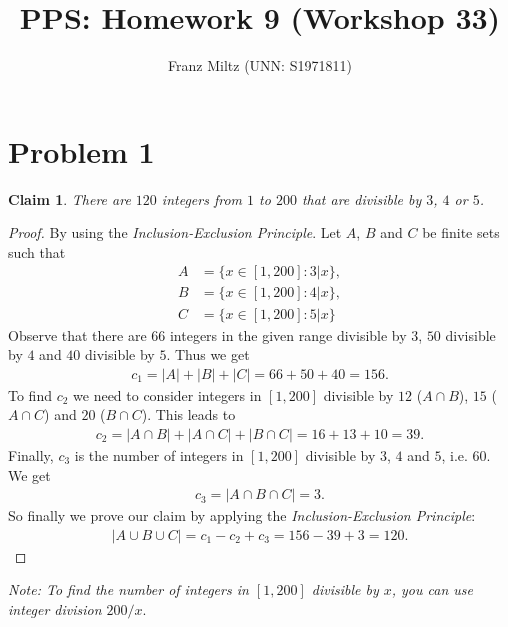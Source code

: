 \documentclass{article}
\title{PPS: Homework 9 (Workshop 33)}
\author{Franz Miltz (UNN: S1971811)}
\newtheorem{claim}[section]{Claim}
\begin{document}
\maketitle
\section*{Problem 1}
\begin{claim}
  There are $120$ integers from $1$ to $200$ that are divisible by $3$, $4$ or $5$.
\end{claim}
\begin{proof}
  By using the \emph{Inclusion-Exclusion Principle}.
   Let $A$, $B$ and $C$ be finite sets such that
  \begin{align*}
    A &= \{x\in [1,200] : 3 | x\},\\
    B &= \{x \in [1,200] : 4|x\},\\
    C &= \{x\in [1,200] : 5|x\}
  \end{align*} 
  Observe that there are $66$ integers in the given range divisible by $3$, $50$ divisible by $4$ and $40$ divisible by $5$. 
  Thus we get
  \begin{align*}
    c_1 = |A| + |B| + |C| = 66 + 50 + 40 = 156.
  \end{align*}
  To find $c_2$ we need to consider integers in $[1,200]$ divisible by $12$ ($A\cap B$), $15$ ($A\cap C$) and $20$ ($B\cap C$). This leads to
  \begin{align*}
    c_2 = |A\cap B| + |A\cap C| + |B \cap C| = 16 + 13 + 10 = 39.
  \end{align*}
  Finally, $c_3$ is the number of integers in $[1,200]$ divisible by $3$, $4$ and $5$, i.e. $60$. We get
  \begin{align*}
    c_3 = |A\cap B \cap C| = 3.
  \end{align*}
  So finally we prove our claim by applying the \emph{Inclusion-Exclusion Principle}:
  \begin{align*}
    |A\cup B \cup C| = c_1- c_2 + c_3 = 156 - 39 + 3 = 120.
  \end{align*}
\end{proof}
\noindent\emph{Note: To find the number of integers in $[1,200]$ divisible by $x$, you can use integer division $200 / x$}.
\end{document}
